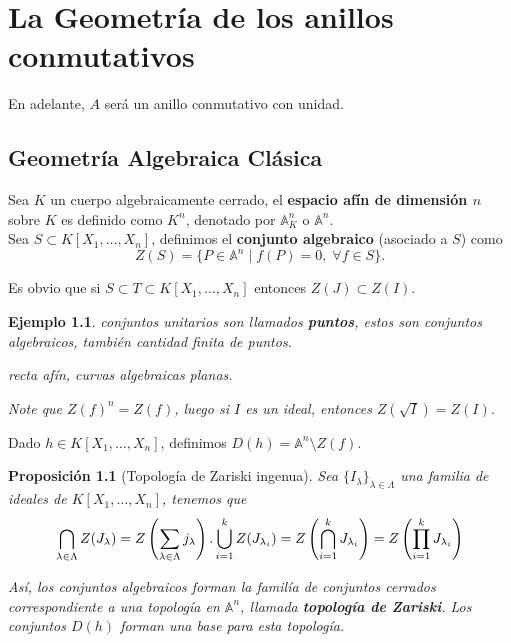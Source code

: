 \documentclass[12pt]{book}
\newtheorem{eje}{Ejemplo}
\newtheorem{pro}{Proposición}
\begin{document}
\chapter{La Geometría de los anillos conmutativos}


En adelante, $A$ será un anillo conmutativo con unidad. \\

\section{Geometría Algebraica Clásica}

Sea $K$ un cuerpo algebraicamente cerrado, el \textbf{espacio afín de dimensión $n$} sobre $K$ es definido como $K^n$, denotado por $ \mathbb{A}^n _K$ o $\mathbb{A}^n$.\\


Sea $S \subset K[X_1, \ldots , X_n]$, definimos el \textbf{conjunto algebraico} (asociado a $S$) como $$Z (S) =\{ P \in \mathbb{A} ^n \; | \; f(P) =0, \; \forall f \in S  \}. $$ 

Es obvio que si $S \subset T \subset K[X_1, \ldots , X_n]$ entonces $Z (J) \subset Z (I)$. 

\begin{eje}
	\item conjuntos unitarios son llamados \textbf{puntos}, estos son conjuntos algebraicos, también cantidad finita de puntos.
	\item recta afín, curvas algebraicas planas.
	\item Note que $Z(f)^n = Z(f)$, luego si $I $ es un ideal, entonces $Z(\sqrt{I})= Z(I)$. 
\end{eje}



Dado $h\in K[X_1, \ldots , X_n]$, definimos $D(h)= \mathbb{A}^n \setminus Z(f) $.

\begin{pro}[Topología de Zariski ingenua]
	Sea $\{I_\lambda\}_{\lambda\in \Lambda}$ una familia de ideales de $K[X_1, \ldots , X_n]$, tenemos que 
	\begin{equation*}
		\bigcap _{\lambda \in \Lambda } Z (J _ \lambda) = Z \left( \sum _{\lambda \in \Lambda} j _\lambda \right).\\
		\bigcup _ {i=1} ^k Z(J _ {\lambda_i}) = Z \left( \bigcap_{i=1 }^k J _{\lambda_i}  \right) =  Z \left( \prod_{i=1 }^k J _{\lambda_i}  \right)
	\end{equation*}
	
	Así, los conjuntos algebraicos forman la familía de conjuntos cerrados correspondiente a una topología en $\mathbb{A}^n$, llamada \textbf{topología de Zariski}. Los conjuntos $D(h)$ forman una base para esta topología.
\end{pro}
\end{document}
